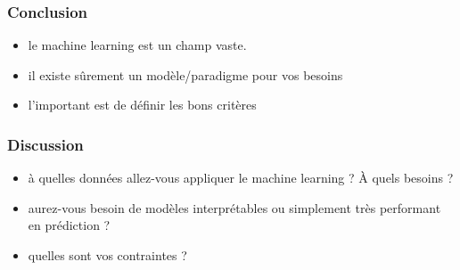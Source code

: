 \begin{frame}
  \frametitle{Conclusion}
  \begin{itemize}
  \item le machine learning est un champ vaste.
  \item il existe sûrement un modèle/paradigme pour vos besoins
  \item l'important est de définir les bons critères
  \end{itemize}
\end{frame}

\begin{frame}
  \frametitle{Discussion}
  \begin{itemize}
  \item à quelles données allez-vous appliquer le machine learning ? À
    quels besoins ?
  \item aurez-vous besoin de modèles interprétables ou simplement très
    performant en prédiction ?
  \item quelles sont vos contraintes ?
  \end{itemize}
\end{frame}
